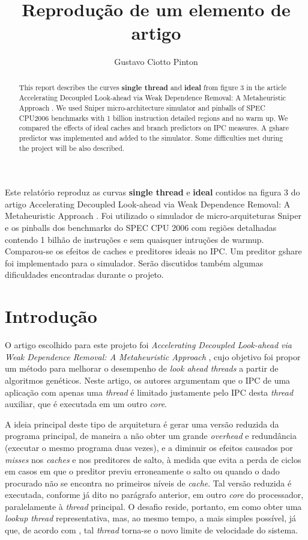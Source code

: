 \documentclass[12pt]{article}
\title{Reprodução de um elemento de artigo}
\author{Gustavo Ciotto Pinton\inst{1} }
\begin{document}
 

\maketitle

\begin{abstract}
This report describes the curves \textbf{single thread} and \textbf{ideal} from
figure 3 in the article Accelerating Decoupled Look-ahead via Weak Dependence
Removal: A Metaheuristic Approach \cite{artigo}. We used
Sniper micro-architecture simulator and pinballs of SPEC CPU2006 benchmarks with
1 billion instruction detailed regions and no warm up. We compared the effects
of ideal caches and branch predictors on IPC measures. A gshare predictor was
implemented and added to the simulator. Some difficulties met during the project
will be also described.
\end{abstract}
     
\begin{resumo} 
Este relatório reproduz as curvas \textbf{single thread} e \textbf{ideal}
contidos na figura 3 do artigo Accelerating Decoupled Look-ahead via Weak Dependence Removal: A Metaheuristic
Approach \cite{artigo}. Foi utilizado o simulador de micro-arquiteturas Sniper e
os pinballs dos benchmarks do SPEC CPU 2006 com regiões detalhadas contendo 1
bilhão de instruções e sem quaisquer intruções de warmup. Comparou-se os efeitos
de caches e preditores ideais no IPC. Um preditor gshare foi implementado para o
simulador. Serão discutidos também algumas dificuldades encontradas durante o
projeto.
\end{resumo}


\section{Introdução}

O artigo escolhido para este projeto foi \textit{Accelerating Decoupled
Look-ahead via Weak Dependence Removal: A Metaheuristic Approach} \cite{artigo},
cujo objetivo foi propor um método para melhorar o desempenho de \textit{look
ahead threads} a partir de algoritmos genéticos. Neste artigo, os autores
argumentam que o IPC de uma aplicação com apenas uma \textit{thread} é limitado
justamente pelo IPC desta \textit{thread} auxiliar, que é executada em um
outro \textit{core}.

A ideia principal deste tipo de arquitetura é gerar uma versão reduzida da
programa principal, de maneira a não obter um grande \textit{overhead} e
redundância (executar o mesmo programa duas vezes), e a diminuir os efeitos
causados por \textit{misses} nos \textit{caches} e nos preditores de salto, à
medida que evita a perda de ciclos em casos em que o preditor previu
erroneamente o salto ou quando o dado procurado não se encontra no primeiros
níveis de \textit{cache}. Tal versão reduzida é executada, conforme já dito no
parágrafo anterior, em outro \textit{core} do processador, paralelamente à
\textit{thread} principal. O desafio reside, portanto, em como obter uma
\textit{lookup thread} representativa, mas, ao mesmo tempo, a mais simples
possível, já que, de acordo com \cite{artigo}, tal \textit{thread} torna-se o
novo limite de velocidade do sistema.
\end{document}
